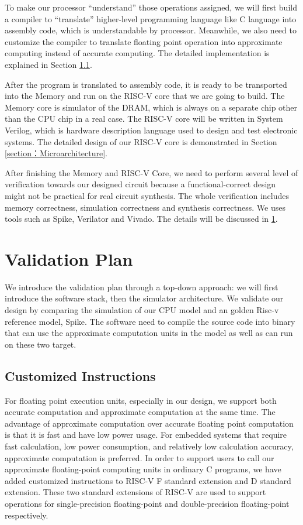 To make our processor ``understand'' those operations assigned, we will first build a compiler to ``translate'' higher-level programming language like C language into assembly code, which is understandable by processor. Meanwhile, we also need to customize the compiler to translate floating point operation into approximate computing instead of accurate computing. The detailed implementation is explained in Section \ref{section：Customized Instructions}.

After the program is translated to assembly code, it is ready to be transported into the Memory and run on the RISC-V core that we are going to build. The Memory core is simulator of the DRAM, which is always on a separate chip other than the CPU chip in a real case. The RISC-V core will be written in System Verilog, which is hardware description language used to design and test electronic systems. The detailed design of our RISC-V core is demonstrated in Section \ref{section：Microarchitecture}. 

After finishing the Memory and RISC-V Core, we need to perform several level of verification towards our designed circuit because a functional-correct design might not be practical for real circuit synthesis. The whole verification includes memory correctness, simulation correctness and synthesis correctness. We uses tools such as Spike, Verilator and Vivado. The details will be discussed in \ref{section: Validation Plan}.

\section{Validation Plan} \label{section: Validation Plan}
We introduce the validation plan through a top-down approach: we will first introduce the software stack, then the simulator architecture. We validate our design by comparing the simulation of our CPU model and an golden Risc-v reference model, Spike. The software need to compile the source code into binary that can use the approximate computation units in the model as well as can run on these two target. 

\subsection{Customized Instructions} \label{section：Customized Instructions} %
For floating point execution units, especially in our design, we support both accurate computation and approximate computation at the same time. The advantage of approximate computation over accurate floating point computation is that it is fast and have low power usage. For embedded systems that require fast calculation, low power consumption, and relatively low calculation accuracy, approximate computation is preferred. In order to support users to call our approximate floating-point computing units in ordinary C programs, we have added customized instructions to RISC-V F standard extension and D standard extension. These two standard extensions of RISC-V are used to support operations for single-precision floating-point and double-precision floating-point respectively.

